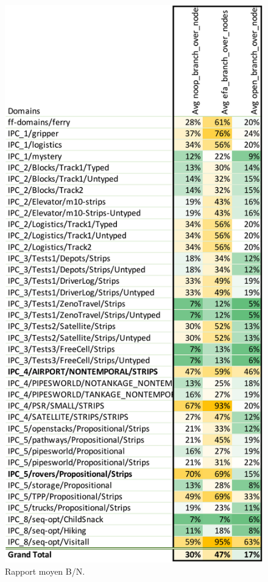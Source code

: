 \begin{figure}[ht!] \centering
\begin{center} \includegraphics[width=.75\textwidth]{tableaux/experiment-branch_vs_nodes-crop.pdf} \end{center}
\caption{Rapport moyen B/N.}
\label{fig:tab-exp-branch-vs-nodes}
\end{figure}

